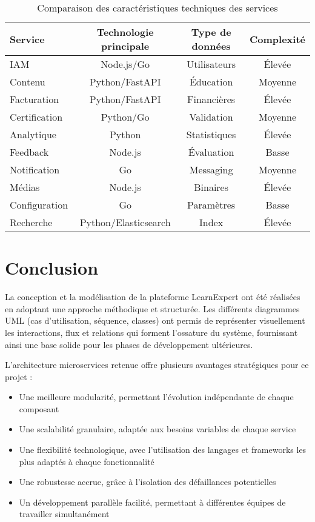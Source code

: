\begin{table}[h!]
\centering
\small
\caption{Comparaison des caractéristiques techniques des services}
\label{tab:comparaison_services}
\begin{tabular}{|l|c|c|c|}
\hline
\textbf{Service} & \textbf{Technologie principale} & \textbf{Type de données} & \textbf{Complexité} \\
\hline
IAM & Node.js/Go & Utilisateurs & Élevée \\
Contenu & Python/FastAPI & Éducation & Moyenne \\
Facturation & Python/FastAPI & Financières & Élevée \\
Certification & Python/Go & Validation & Moyenne \\
Analytique & Python & Statistiques & Élevée \\
Feedback & Node.js & Évaluation & Basse \\
Notification & Go & Messaging & Moyenne \\
Médias & Node.js & Binaires & Élevée \\
Configuration & Go & Paramètres & Basse \\
Recherche & Python/Elasticsearch & Index & Élevée \\
\hline
\end{tabular}
\end{table}
\normalsize 

\section{Conclusion}

La conception et la modélisation de la plateforme LearnExpert ont été réalisées en adoptant une approche méthodique et structurée. Les différents diagrammes UML (cas d'utilisation, séquence, classes) ont permis de représenter visuellement les interactions, flux et relations qui forment l'ossature du système, fournissant ainsi une base solide pour les phases de développement ultérieures.

L'architecture microservices retenue offre plusieurs avantages stratégiques pour ce projet :
\begin{itemize}
  \item Une meilleure modularité, permettant l'évolution indépendante de chaque composant
  \item Une scalabilité granulaire, adaptée aux besoins variables de chaque service
  \item Une flexibilité technologique, avec l'utilisation des langages et frameworks les plus adaptés à chaque fonctionnalité
  \item Une robustesse accrue, grâce à l'isolation des défaillances potentielles
  \item Un développement parallèle facilité, permettant à différentes équipes de travailler simultanément
\end{itemize}

